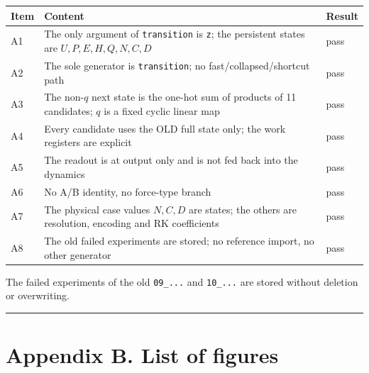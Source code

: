 \documentclass[
  a4paper,
]{article}
\newcounter{none} %
\begin{document}
{\def\LTcaptype{none} %
\begin{longtable}[]{@{}
  >{\raggedright\arraybackslash}p{}
  >{\raggedright\arraybackslash}p{}
  >{\raggedright\arraybackslash}p{}@{}}
\toprule\noalign{}
\begin{minipage}[b]{\linewidth}\raggedright
Item
\end{minipage} & \begin{minipage}[b]{\linewidth}\raggedright
Content
\end{minipage} & \begin{minipage}[b]{\linewidth}\raggedright
Result
\end{minipage} \\
\midrule\noalign{}
\endhead
\bottomrule\noalign{}
\endlastfoot
A1 & The only argument of \texttt{transition} is \texttt{z}; the
persistent states are \(U,P,E,H,Q,N,C,D\) & pass \\
A2 & The sole generator is \texttt{transition}; no
fast/collapsed/shortcut path & pass \\
A3 & The non-\(q\) next state is the one-hot sum of products of 11
candidates; \(q\) is a fixed cyclic linear map & pass \\
A4 & Every candidate uses the OLD full state only; the work registers
are explicit & pass \\
A5 & The readout is at output only and is not fed back into the dynamics
& pass \\
A6 & No A/B identity, no force-type branch & pass \\
A7 & The physical case values \(N,C,D\) are states; the others are
resolution, encoding and RK coefficients & pass \\
A8 & The old failed experiments are stored; no reference import, no
other generator & pass \\
\end{longtable}
}

The failed experiments of the old \texttt{09\_...} and \texttt{10\_...}
are stored without deletion or overwriting.

\begin{center}\rule{0.5\linewidth}{0.5pt}\end{center}

\section{Appendix B. List of figures}\label{appendix-b.-list-of-figures}
\end{document}
